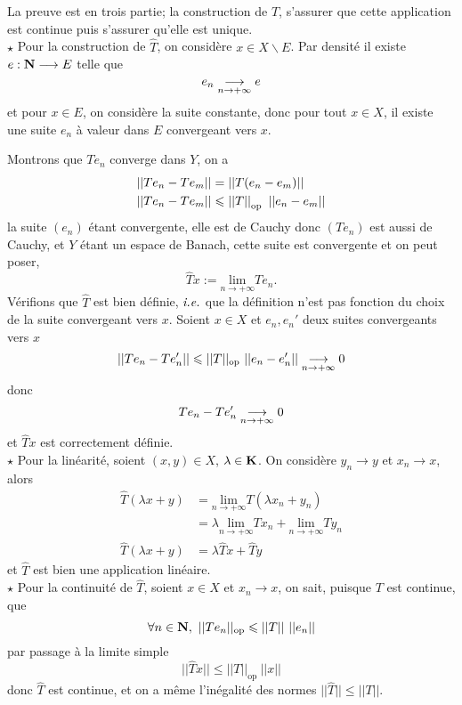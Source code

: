\documentclass[a4paper,11pt, twoside]{article}
\begin{document}
\begin{Proof}
  La preuve est en trois partie; la construction de $\hat T$, s'assurer que cette application est continue puis s'assurer qu'elle est unique.\\

  $\star$ Pour la construction de $\hat T$, on considère $x\in X\backslash E$. Par densité il existe $e:\mathbf N\longrightarrow E$ telle que 
  $$e_n\underset{n\to+\infty}{\longrightarrow} e$$
  et pour $x\in E$, on considère la suite constante, donc pour tout $x\in X$, il existe une suite $e_n$ à valeur dans $E$ convergeant vers $x$.

  Montrons que $Te_n$ converge dans $Y$, on a 
  \begin{align*}
    ||Te_n-Te_m||&=||T(e_n-e_m)||\\
    ||Te_n-Te_m||&\leqslant \left|\left|T\right|\right|_{\mathrm{op}}\ ||e_n-e_m||
  \end{align*}
  la suite $(e_n)$ étant convergente, elle est de Cauchy donc $(Te_n)$ est aussi de Cauchy, et $Y$ étant un espace de Banach, cette suite est convergente et on peut poser, 
  $$\hat Tx:=\underset{n\to+\infty}{\mathrm{lim}}Te_n.$$
  Vérifions que $\hat T$ est bien définie, $\emph{i.e.}$ que la définition n'est pas fonction du choix de la suite convergeant vers $x$. Soient $x\in X$ et $e_n,e_n'$ deux suites convergeants vers $x$
  $$||Te_n-Te_n'||\leqslant||T||_{\mathrm{op}}\ ||e_n-e_n'||\tend0$$
  donc 
  $$Te_n-Te_n'\underset{n\to+\infty}{\longrightarrow} 0$$
  et $\hat Tx$ est correctement définie.\\

  $\star$ Pour la linéarité, soient $(x,y)\in X$, $\lambda\in\mathbf K$. On considère $y_n\longrightarrow y$ et $x_n\longrightarrow x$, alors
  \begin{align*}
    \hat T(\lambda x+y)&=\underset{n\to+\infty}{\mathrm{lim}}T(\lambda x_n+y_n)\\
    &=\lambda\underset{n\to+\infty}{\mathrm{lim}}Tx_n+\underset{n\to+\infty}{\mathrm{lim}}Ty_n\\
    \hat T(\lambda x+y)&=\lambda\hat Tx+\hat Ty
  \end{align*}
  et $\hat T$ est bien une application linéaire.\\

  $\star$ Pour la continuité de $\hat T$, soient $x\in X$ et $x_n\longrightarrow x$, on sait, puisque $T$ est continue, que 
  $$\forall n\in\N,\ ||Te_n||_{\mathrm{op}}\leqslant ||T||\ ||e_n||$$
  par passage à la limite simple
  $$||\hat Tx||\leqslant ||T||_{\mathrm{op}}\ ||x||$$
  donc $\hat T$ est continue, et on a même l'inégalité des normes $||\hat T||\leqslant ||T||$.\\


\end{Proof}
\end{document}
